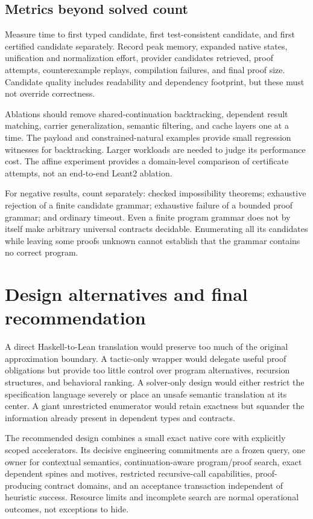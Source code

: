 \subsection{Metrics beyond solved count}
Measure time to first typed candidate, first test-consistent candidate, and first certified candidate separately. Record peak memory, expanded native states, unification and normalization effort, provider candidates retrieved, proof attempts, counterexample replays, compilation failures, and final proof size. Candidate quality includes readability and dependency footprint, but these must not override correctness.

Ablations should remove shared-continuation backtracking, dependent result matching, carrier generalization, semantic filtering, and cache layers one at a time. The payload and constrained-natural examples provide small regression witnesses for backtracking. Larger workloads are needed to judge its performance cost. The affine experiment provides a domain-level comparison of certificate attempts, not an end-to-end Leant2 ablation.

For negative results, count separately: checked impossibility theorems; exhaustive rejection of a finite candidate grammar; exhaustive failure of a bounded proof grammar; and ordinary timeout. Even a finite program grammar does not by itself make arbitrary universal contracts decidable. Enumerating all its candidates while leaving some proofs unknown cannot establish that the grammar contains no correct program.

\section{Design alternatives and final recommendation}
\label{sec:conclusion}
A direct Haskell-to-Lean translation would preserve too much of the original approximation boundary. A tactic-only wrapper would delegate useful proof obligations but provide too little control over program alternatives, recursion structures, and behavioral ranking. A solver-only design would either restrict the specification language severely or place an unsafe semantic translation at its center. A giant unrestricted enumerator would retain exactness but squander the information already present in dependent types and contracts.

The recommended design combines a small exact native core with explicitly scoped accelerators. Its decisive engineering commitments are a frozen query, one owner for contextual semantics, continuation-aware program/proof search, exact dependent spines and motives, restricted recursive-call capabilities, proof-producing contract domains, and an acceptance transaction independent of heuristic success. Resource limits and incomplete search are normal operational outcomes, not exceptions to hide.

